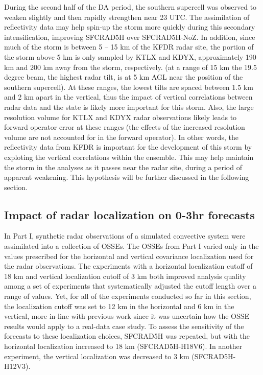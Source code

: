 During the second half of the DA period, the southern supercell was observed to weaken slightly and then rapidly strengthen near 23 UTC. The assimilation of reflectivity data may help spin-up the storm more quickly during this secondary intensification, improving SFCRAD5H over SFCRAD5H-NoZ. In addition, since much of the storm is between 5 -- 15 km of the KFDR radar site, the portion of the storm above 5 km is only sampled by KTLX and KDYX, approximately 190 km and 200 km away from the storm, respectively. (at a range of 15 km the 19.5 degree beam, the highest radar tilt, is at 5 km AGL near the position of the southern supercell). At these ranges, the lowest tilts are spaced between 1.5 km and 2 km apart in the vertical, thus the impact of vertical correlations between radar data and the state is likely more important for this storm. Also, the large resolution volume for KTLX and KDYX radar observations likely leads to forward operator error at these ranges (the effects of the increased resolution volume are not accounted for in the forward operator). In other words, the reflectivity data from KFDR is important for the development of this storm by exploting the vertical correlations within the ensemble. This may help maintain the storm in the analyses as it passes near the radar site, during a period of apparent weakening. This hypothesis will be further discussed in the following section.

\subsection{Impact of radar localization on 0-3hr forecasts}
In Part I, synthetic radar observations of a simulated convective system were assimilated into a collection of OSSEs. The OSSEs from Part I varied only in the values prescribed for the horizontal and vertical covariance localization used for the radar observations. The experiments with a horizontal localization cutoff of 18 km and vertical localization cutoff of 3 km both improved analysis quality among a set of experiments that systematically adjusted the cutoff length over a range of values. Yet, for all of the experiments conducted so far in this section, the localization cutoff was set to 12 km in the horizontal and 6 km in the vertical, more in-line with previous work since it was uncertain how the OSSE results would apply to a real-data case study. To assess the sensitivity of the forecasts to these localization choices, SFCRAD5H was repeated, but with the horizontal localization increased to 18 km (SFCRAD5H-H18V6). In another experiment, the vertical localization was decreased to 3 km (SFCRAD5H-H12V3).

